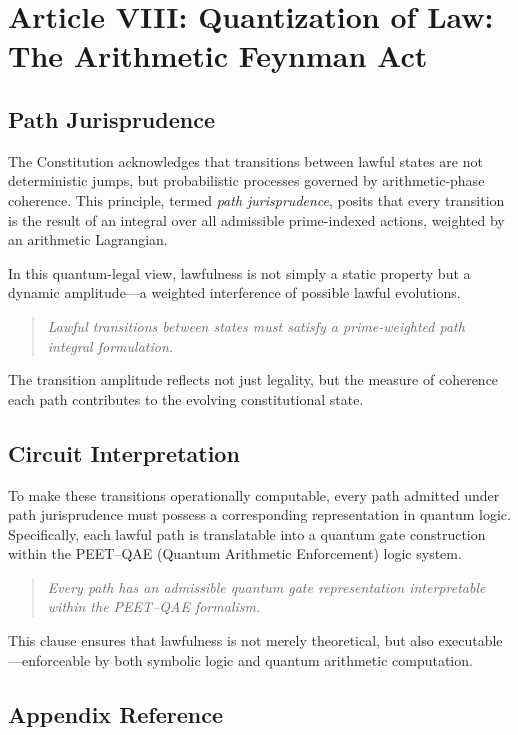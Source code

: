\documentclass[12]{amsart}
\theoremstyle{plain}
\begin{document}
\section{Article VIII: Quantization of Law: The Arithmetic Feynman Act}

\subsection{Path Jurisprudence}

The Constitution acknowledges that transitions between lawful states are not deterministic jumps, but probabilistic processes governed by arithmetic-phase coherence. This principle, termed \textit{path jurisprudence}, posits that every transition is the result of an integral over all admissible prime-indexed actions, weighted by an arithmetic Lagrangian.

In this quantum-legal view, lawfulness is not simply a static property but a dynamic amplitude—a weighted interference of possible lawful evolutions.

\begin{quote}
\textit{Lawful transitions between states must satisfy a prime-weighted path integral formulation.}
\end{quote}

The transition amplitude reflects not just legality, but the measure of coherence each path contributes to the evolving constitutional state.

\subsection{Circuit Interpretation}

To make these transitions operationally computable, every path admitted under path jurisprudence must possess a corresponding representation in quantum logic. Specifically, each lawful path is translatable into a quantum gate construction within the PEET–QAE (Quantum Arithmetic Enforcement) logic system.

\begin{quote}
\textit{Every path has an admissible quantum gate representation interpretable within the PEET–QAE formalism.}
\end{quote}

This clause ensures that lawfulness is not merely theoretical, but also executable—enforceable by both symbolic logic and quantum arithmetic computation.

\subsection*{Appendix Reference}
\end{document}
